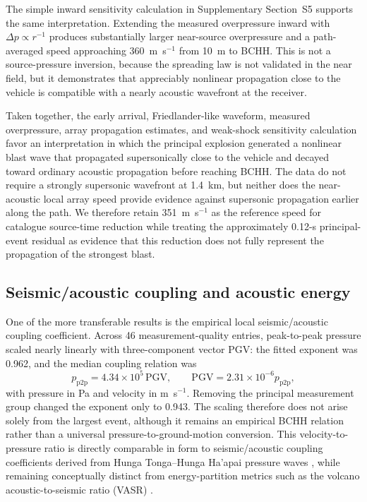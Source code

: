 \documentclass[]{seismica}
\begin{document}
The simple inward sensitivity calculation in Supplementary Section~S5
supports the same interpretation. Extending the measured overpressure inward
with $\Delta p\propto r^{-1}$ produces substantially larger near-source
overpressure and a path-averaged speed approaching 360~m~s$^{-1}$ from
10~m to BCHH. This is not a source-pressure inversion, because the spreading
law is not validated in the near field, but it demonstrates that appreciably
nonlinear propagation close to the vehicle is compatible with a nearly
acoustic wavefront at the receiver.

Taken together, the early arrival, Friedlander-like waveform, measured
overpressure, array propagation estimates, and weak-shock sensitivity
calculation favor an interpretation in which the principal explosion generated
a nonlinear blast wave that propagated supersonically close to the vehicle and
decayed toward ordinary acoustic propagation before reaching BCHH. The data do
not require a strongly supersonic wavefront at 1.4~km, but neither does the
near-acoustic local array speed provide evidence against supersonic propagation
earlier along the path. We therefore retain 351~m~s$^{-1}$ as the reference
speed for catalogue source-time reduction while treating the approximately
0.12-s principal-event residual as evidence that this reduction does not fully
represent the propagation of the strongest blast.

\subsection{Seismic/acoustic coupling and acoustic energy}

One of the more transferable results is the empirical local
seismic/acoustic coupling coefficient. Across 46 measurement-quality entries,
peak-to-peak pressure scaled nearly linearly with three-component vector PGV:
the fitted exponent was 0.962, and the median coupling relation was
\[
 p_{\mathrm{p2p}}=4.34\times10^5\,\mathrm{PGV},
 \qquad
 \mathrm{PGV}=2.31\times10^{-6}p_{\mathrm{p2p}},
\]
with pressure in Pa and velocity in m~s$^{-1}$. Removing the principal
measurement group changed the exponent only to 0.943. The scaling therefore
does not arise solely from the largest event, although it remains an empirical
BCHH relation rather than a universal pressure-to-ground-motion conversion.
This velocity-to-pressure ratio is directly comparable in form to
seismic/acoustic coupling coefficients derived from Hunga Tonga--Hunga Ha'apai
pressure waves
\citep{anthony_hunga_coupling_2023,macpherson_hunga_coupling_2025}, while
remaining conceptually distinct from energy-partition metrics such as the
volcano acoustic-to-seismic ratio (VASR) \citep{johnson_aster_2005}.
\end{document}
